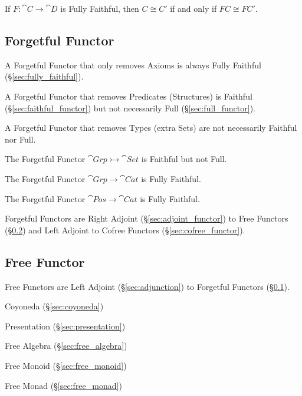 If $F : \cat{C} \rightarrow \cat{D}$ is Fully Faithful, then $C
\cong C'$ if and only if $FC \cong FC'$.



\subsection{Forgetful Functor}\label{sec:forgetful_functor}

A Forgetful Functor that only removes Axioms is always Fully Faithful
(\S\ref{sec:fully_faithful}).

A Forgetful Functor that removes Predicates (Structures) is Faithful
(\S\ref{sec:faithful_functor}) but not necessarily Full
(\S\ref{sec:full_functor}).

A Forgetful Functor that removes Types (extra Sets) are not
necessarily Faithful nor Full.

The Forgetful Functor $\cat{Grp} \rightarrowtail \cat{Set}$ is
Faithful but not Full.

The Forgetful Functor $\cat{Grp} \rightarrow \cat{Cat}$ is
Fully Faithful.

The Forgetful Functor $\cat{Pos} \rightarrow \cat{Cat}$ is
Fully Faithful.

Forgetful Functors are Right Adjoint (\S\ref{sec:adjoint_functor}) to
Free Functors (\S\ref{sec:free_functor}) and Left Adjoint to Cofree
Functors (\S\ref{sec:cofree_functor}).



\subsection{Free Functor}\label{sec:free_functor}

Free Functors are Left Adjoint (\S\ref{sec:adjunction}) to Forgetful
Functors (\S\ref{sec:forgetful_functor}).

Coyoneda (\S\ref{sec:coyoneda})

Presentation (\S\ref{sec:presentation})

Free Algebra (\S\ref{sec:free_algebra})

Free Monoid (\S\ref{sec:free_monoid})

Free Monad (\S\ref{sec:free_monad})

